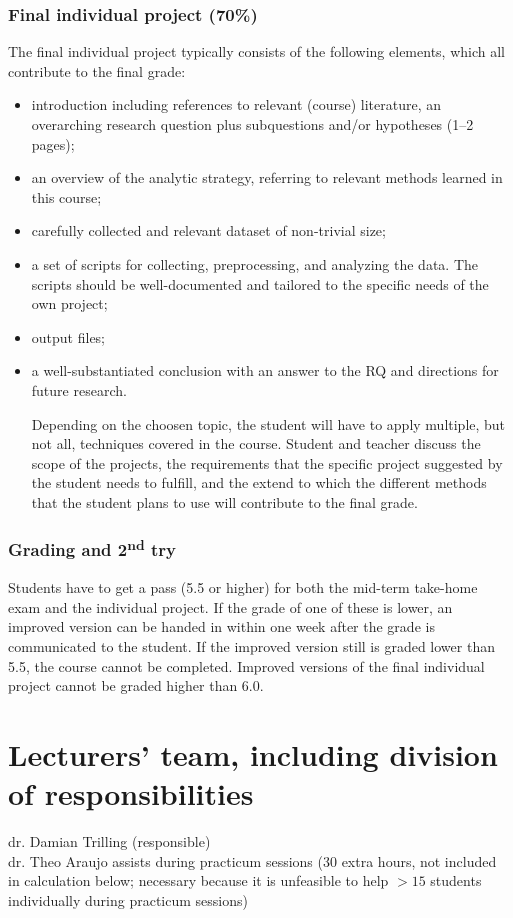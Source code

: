 \documentclass[a4paper,12pt]{report}
\begin{document}
\subsection*{Final individual project (70\%)}
The final individual project typically consists of the following elements, which all contribute to the final grade:
\begin{itemize}
\item introduction including references to relevant (course) literature, an overarching research question plus subquestions and/or hypotheses (1–2 pages);
\item an overview of the analytic strategy, referring to relevant methods learned in this course;
\item carefully collected and relevant dataset of non-trivial size;
\item a set of scripts for collecting, preprocessing, and analyzing the data. The scripts should be well-documented and tailored to the specific needs of the own project;
\item output files;
\item a well-substantiated conclusion with an answer to the RQ and directions for future research.

Depending on the choosen topic, the student will have to apply multiple, but not all, techniques covered in the course. Student and teacher discuss the scope of the projects, the requirements that the specific project suggested by the student needs to fulfill, and the extend to which the different methods that the student plans to use will contribute to the final grade. 

\end{itemize}

\subsection*{Grading and 2\textsuperscript{nd} try}
Students have to get a pass (5.5 or higher) for both the mid-term take-home exam and the individual project. If the grade of one of these is lower, an improved version can be handed in within one week after the grade is communicated to the student. If the improved version still is graded lower than 5.5, the course cannot be completed. Improved versions of the final individual project cannot be graded higher than 6.0. 


\chapter{Lecturers' team, including division of responsibilities}
dr. Damian Trilling (responsible)\\
dr. Theo Araujo assists during practicum sessions (30 extra hours, not included in calculation below; necessary because it is unfeasible to help $>15$ students individually during practicum sessions)
\end{document}
